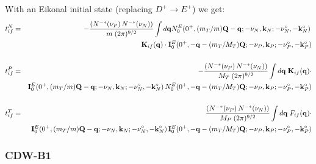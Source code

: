 With an Eikonal initial state (replacing $D^{+} \to E^{+}$) we get:
\begin{eqnarray}\label{Q:tn_if-eikon}
t^{N}_{if}&=& -\frac{\left(N^{-*}(\nu_{P}) \,N^{-*}(\nu_{N}) \right)}{m
\; (2 \pi)^{9/2}} \int d \mathbf{q} N^{E}_{0}(0^{+}, (m_{T}/m)\mathbf{Q} -
\mathbf{q}; -\nu_{N}, \mathbf{k}_{N}; -\nu_{N}^{\circ}, -\mathbf{k}_{N}^{\circ} ) \,
  \\
&& \mathbf{K}_{if}(\mathbf{q}) \cdot \mathbf{I}^{E}_{0}( 0^{+} ,
-\mathbf{q}-(m_{T}/M_{T})\mathbf{Q} ; -\nu_{P}, \mathbf{k}_{P} ; -\nu_{P}^{\circ},
-\mathbf{k}_{P}^{\circ}) \nonumber
  \\
\nonumber \\
t^{P}_{if} &=& -\frac{\left(N^{-*}(\nu_{P}) \,N^{-*}(\nu_{N})
\right)}{M_{T} \; (2 \pi)^{9/2}} \int d \mathbf{q} \;
\mathbf{K}_{if}(\mathbf{q}) \cdot
  \\
&& \mathbf{I}^{E}_{0}(0^{+}, (m_{T}/m)\mathbf{Q} - \mathbf{q}; -\nu_{N},
\mathbf{k}_{N}; -\nu_{N}^{\circ}, -\mathbf{k}_{N}^{\circ} ) \,  N^{E}_{0}( 0^{+} ,
-\mathbf{q}-(m_{T}/M_{T})\mathbf{Q};-\nu_{P},\mathbf{k}_{P}; -\nu_{P}^{\circ},
-\mathbf{k}_{P}^{\circ}) \nonumber
\\
\nonumber \\
t^{T}_{if}&=& \frac{\left(N^{-*}(\nu_{P}) \,N^{-*}(\nu_{N})
\right)}{M_{P} \; (2 \pi)^{9/2}} \int d \mathbf{q} \; F_{if}(\mathbf{q})
\cdot
  \\
&& \mathbf{I}^{E}_{0}(0^{+}, (m_{T}/m)\mathbf{Q} - \mathbf{q}; -\nu_{N},
\mathbf{k}_{N}; -\nu_{N}^{\circ}, -\mathbf{k}_{N}^{\circ} ) \,  \mathbf{I}^{E}_{0}( 0^{+} ,
-\mathbf{q}-(m_{T}/M_{T})\mathbf{Q};-\nu_{P},\mathbf{k}_{P}; -\nu_{P}^{\circ},
-\mathbf{k}_{P}^{\circ}) \nonumber
\end{eqnarray}

\subsubsection{CDW-B1}

